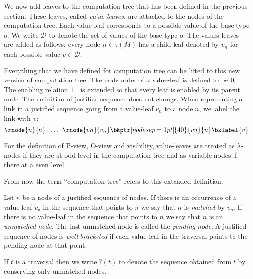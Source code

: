 We now add leaves to the computation tree that has been defined in the previous section.
These leaves, called \emph{value-leaves}, are attached to the nodes of the computation tree. Each
value-leaf corresponds to a possible value of the base type $o$.
We write $\mathcal{D}$ to denote the set of values of the base type
$o$. The values leaves are added as follows: every  %
node $n \in \tau(M)$ has a child leaf denoted by $v_n$ for each possible value $v \in \mathcal{D}$.



Everything that we have defined for computation tree can be lifted
to this new version of computation tree. The node order of a
value-leaf is defined to be $0$. The enabling relation $\vdash$ is
extended so that every leaf is enabled by its parent node. The
definition of justified sequence does not change.
When representing a link in a justified sequence going from a value-leaf $v_n$ to a node $n$,
we label the link with $v$:
$$
\rnode{n}{n} \cdot \ldots \cdot \rnode{vn}{v_n} \bkptr[nodesep=1pt]{40}{vn}{n} \bklabel{v}
$$


For the definition
of P-view, O-view and visibility, value-leaves are treated as
$\lambda$-nodes if they are at odd level in the computation tree and
as variable nodes if there at a even level.

From now the term ``computation tree'' refers to this extended
definition.
\vspace{10pt}

Let $n$ be a node of a justified sequence of nodes.
If there is an occurrence of a value-leaf $v_n$ in the sequence that points to $n$ we say that
$n$ is \emph{matched} by $v_n$. If there is no value-leaf in the sequence that points to $n$ we
say that $n$ is an \emph{unmatched node}.
The last unmatched node is called the \emph{pending node}.
A justified sequence of nodes is \emph{well-bracketed} if
each value-leaf in the traversal points to the pending node at that point.

If $t$ is a traversal then we write $?(t)$ to denote the sequence
obtained from $t$ by conserving only unmatched nodes.

